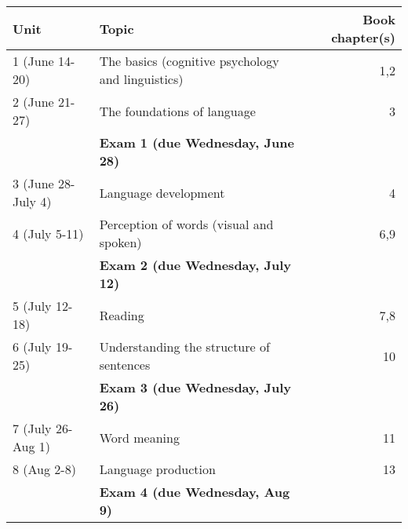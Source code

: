 \documentclass[10pt]{article}
\begin{document}
\begin{center}
\begin{tabular}{llr}
Unit & Topic & Book chapter(s)\\
\hline
1 (June 14-20) & The basics (cognitive psychology and linguistics) & 1,2\\
2 (June 21-27) & The foundations of language & 3\\
 & \textbf{Exam 1 (due Wednesday, June 28)} & \\
3 (June 28-July 4) & Language development & 4\\
4 (July 5-11) & Perception of words (visual and spoken) & 6,9\\
 & \textbf{Exam 2 (due Wednesday, July 12)} & \\
5 (July 12-18) & Reading & 7,8\\
6 (July 19-25) & Understanding the structure of sentences & 10\\
 & \textbf{Exam 3 (due Wednesday, July 26)} & \\
7 (July 26-Aug 1) & Word meaning & 11\\
8 (Aug 2-8) & Language production & 13\\
 & \textbf{Exam 4 (due Wednesday, Aug 9)} & \\
\end{tabular}
\end{center}
\end{document}
